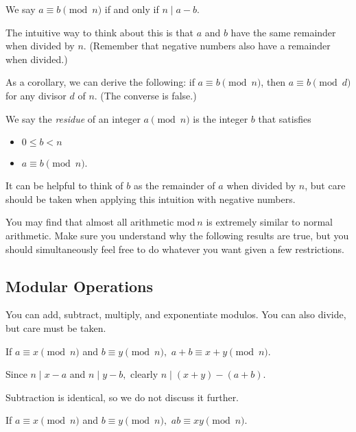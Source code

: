 \documentclass[mast]{lucky}
\begin{document}
\begin{defi}
We say $a\equiv b\pmod {n}$ if and only if $n\mid a-b.$
\end{defi}

The intuitive way to think about this is that $a$ and $b$ have the same remainder when divided by $n.$ (Remember that negative numbers also have a remainder when divided.)

As a corollary, we can derive the following: if $a\equiv b\pmod {n}$, then $a\equiv b\pmod {d}$ for any divisor $d$ of $n$. (The converse is false.)

\begin{defi}
We say the \textit{residue} of an integer $a\pmod{n}$ is the integer $b$ that satisfies
\begin{itemize}
    \item $0\leq b<n$
    \item $a\equiv b\pmod{n}.$
\end{itemize}
\end{defi}

It can be helpful to think of $b$ as the remainder of $a$ when divided by $n$, but care should be taken when applying this intuition with negative numbers.

You may find that almost all arithmetic $\text{mod} \ n$ is extremely similar to normal arithmetic. Make sure you understand why the following results are true, but you should simultaneously feel free to do whatever you want given a few restrictions. 

\subsection{Modular Operations}
You can add, subtract, multiply, and exponentiate modulos. You can also divide, but care must be taken.

\begin{fact}[Addition]
If $a \equiv x\pmod{n}$ and $b\equiv y\pmod{n},$ $a+b\equiv x+y\pmod{n}.$
\end{fact}

\begin{pro}
Since $n\mid x-a$ and $n\mid y-b,$ clearly $n\mid(x+y)-(a+b).$
\end{pro}

Subtraction is identical, so we do not discuss it further.

\begin{fact}[Multiplication]
If $a \equiv x\pmod{n}$ and $b\equiv y\pmod{n},$ $ab\equiv xy\pmod{n}.$
\end{fact}
\end{document}
